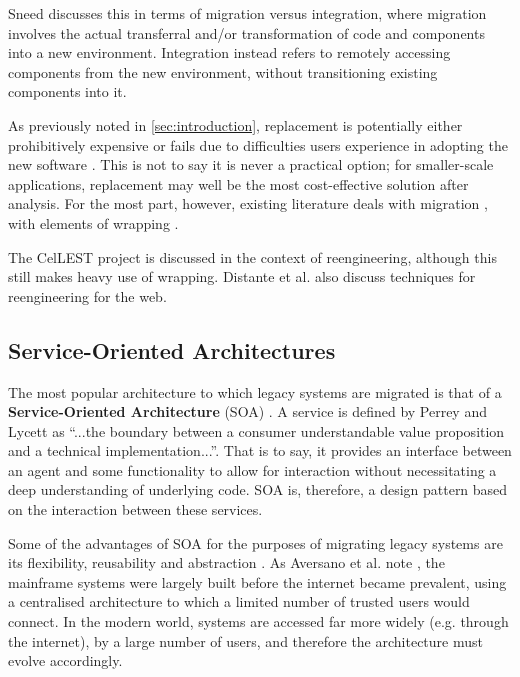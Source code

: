 \documentclass[12pt,journal,compsoc]{IEEEtran}
\begin{document}
Sneed \cite{Sneed2009} discusses this in terms of migration versus integration, where migration involves the actual transferral and/or transformation of code and components into a new environment. Integration instead refers to remotely accessing components from the new environment, without transitioning existing components into it.

As previously noted in \autoref{sec:introduction}, replacement is potentially either prohibitively expensive \cite{Duncan1996} or fails due to difficulties users experience in adopting the new software \cite{Sneed2011}. This is not to say it is never a practical option; for smaller-scale applications, replacement may well be the most cost-effective solution after analysis. For the most part, however, existing literature deals with migration \cite{Aversano2001,Bodhuin2002,Canfora2006,Canfora2000,Canfora2008,Lucia1997,Lewis2006,Sneed2011,Sneed2008,Sneed2009,Sneed2013,Wu2005,Sneed1996,Duncan1996}, with elements of wrapping \cite{Chiang2001,Canfora2008,Sneed1996,Sneed2003}.

The CelLEST project \cite{Stroulia2002} is discussed in the context of reengineering, although this still makes heavy use of wrapping. Distante et al. \cite{Distante2006} also discuss techniques for reengineering for the web.

\subsection{Service-Oriented Architectures}
\label{subsec:soa}
The most popular architecture to which legacy systems are migrated is that of a \textbf{Service-Oriented Architecture} (SOA) \cite{Sneed2008,Almonaies2010,Koschel2009,Canfora2006,Sneed2009,Canfora2008}. A service is defined by Perrey and Lycett \cite{Perrey2003} as ``...the boundary between a consumer understandable value proposition and a technical implementation...''. That is to say, it provides an interface between an agent and some functionality to allow for interaction without necessitating a deep understanding of underlying code. SOA is, therefore, a design pattern based on the interaction between these services.

Some of the advantages of SOA for the purposes of migrating legacy systems are its flexibility, reusability and abstraction \cite{Almonaies2010}. As Aversano et al. note \cite{Aversano2001}, the mainframe systems were largely built before the internet became prevalent, using a centralised architecture to which a limited number of trusted users would connect. In the modern world, systems are accessed far more widely (e.g. through the internet), by a large number of users, and therefore the architecture must evolve accordingly.
\end{document}
